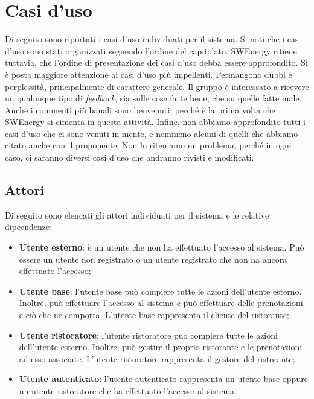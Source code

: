 \section{Casi d'uso}

Di seguito sono riportati i casi d'uso individuati per il sistema. Si noti che i
casi d'uso sono stati organizzati seguendo l'ordine del capitolato. SWEnergy
ritiene tuttavia, che l'ordine di presentazione dei casi d'uso debba essere
approfondito. Si è posta maggiore attenzione ai casi d'uso più impellenti.
Permangono dubbi e perplessità, principalmente di carattere generale. Il gruppo
è interessato a ricevere un qualunque tipo di \textit{feedback}, sia sulle cose
fatte bene, che su quelle fatte male. Anche i commenti più banali sono
benvenuti, perché è la prima volta che SWEnergy si cimenta in questa attività.
Infine, non abbiamo approfondito tutti i casi d'uso che ci sono venuti in mente,
e nemmeno alcuni di quelli che abbiamo citato anche con il proponente. Non lo
riteniamo un problema, perché in ogni caso, ci saranno diversi casi d'uso che
andranno rivisti e modificati.

\subsection{Attori}

Di seguito sono elencati gli attori individuati per il sistema e le relative
dipeendenze:
\begin{itemize}
	\item \textbf{Utente esterno}: è un utente che non ha effettuato l'accesso al
	      sistema. Può essere un utente non registrato o un utente registrato che non ha
	      ancora effettuato l'accesso;

	\item \textbf{Utente base}: l'utente base può compiere tutte le azioni
	      dell'utente esterno. Inoltre, può effettuare l'accesso al sistema e può
	      effettuare delle prenotazioni e ciò che ne comporta. L'utente base rappresenta
	      il cliente del ristorante;

	\item \textbf{Utente ristoratore}: l'utente ristoratore può compiere tutte le
	      azioni dell'utente esterno. Inoltre, può gestire il proprio ristorante e le
	      prenotazioni ad esso associate. L'utente ristoratore rappresenta il gestore del
	      ristorante;

	\item \textbf{Utente autenticato}: l'utente autenticato rappresenta un utente
	      base oppure un utente ristoratore che ha effettuato l'accesso al sistema.
\end{itemize}
